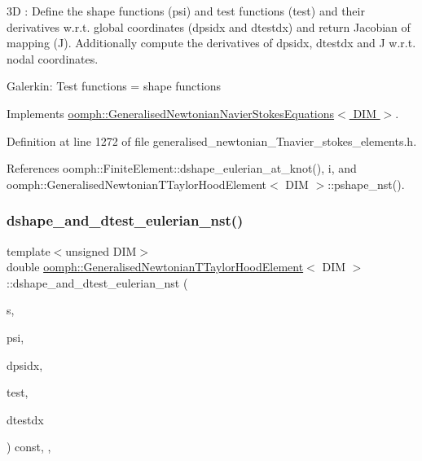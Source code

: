 3D \+: Define the shape functions (psi) and test functions (test) and their derivatives w.\+r.\+t. global coordinates (dpsidx and dtestdx) and return Jacobian of mapping (J). Additionally compute the derivatives of dpsidx, dtestdx and J w.\+r.\+t. nodal coordinates.

Galerkin\+: Test functions = shape functions 

Implements \hyperlink{classoomph_1_1GeneralisedNewtonianNavierStokesEquations_a24a93b73dba66e04eabb9b37a9360daa}{oomph\+::\+Generalised\+Newtonian\+Navier\+Stokes\+Equations$<$ D\+I\+M $>$}.



Definition at line 1272 of file generalised\+\_\+newtonian\+\_\+\+Tnavier\+\_\+stokes\+\_\+elements.\+h.



References oomph\+::\+Finite\+Element\+::dshape\+\_\+eulerian\+\_\+at\+\_\+knot(), i, and oomph\+::\+Generalised\+Newtonian\+T\+Taylor\+Hood\+Element$<$ D\+I\+M $>$\+::pshape\+\_\+nst().

\mbox{\label{classoomph_1_1GeneralisedNewtonianTTaylorHoodElement_a3efc1cebd25ebbe9d2a00b2ca6bda6cf}} 
\subsubsection{\texorpdfstring{dshape\+\_\+and\+\_\+dtest\+\_\+eulerian\+\_\+nst()}{dshape\_and\_dtest\_eulerian\_nst()}}
{\footnotesize\ttfamily template$<$unsigned D\+IM$>$ \\
double \hyperlink{classoomph_1_1GeneralisedNewtonianTTaylorHoodElement}{oomph\+::\+Generalised\+Newtonian\+T\+Taylor\+Hood\+Element}$<$ D\+IM $>$\+::dshape\+\_\+and\+\_\+dtest\+\_\+eulerian\+\_\+nst (\begin{DoxyParamCaption}\item[{const \hyperlink{classoomph_1_1Vector}{Vector}$<$ double $>$ \&}]{s,  }\item[{\hyperlink{classoomph_1_1Shape}{Shape} \&}]{psi,  }\item[{\hyperlink{classoomph_1_1DShape}{D\+Shape} \&}]{dpsidx,  }\item[{\hyperlink{classoomph_1_1Shape}{Shape} \&}]{test,  }\item[{\hyperlink{classoomph_1_1DShape}{D\+Shape} \&}]{dtestdx }\end{DoxyParamCaption}) const\hspace{0.3cm}{\ttfamily [inline]}, {\ttfamily [protected]}, {\ttfamily [virtual]}}



